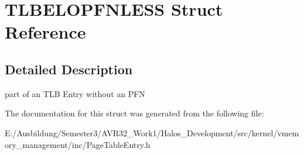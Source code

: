 \hypertarget{struct_t_l_b_e_l_o_p_f_n_l_e_s_s}{
\section{TLBELOPFNLESS Struct Reference}
\label{struct_t_l_b_e_l_o_p_f_n_l_e_s_s}
}


\subsection{Detailed Description}
part of an TLB Entry without an PFN 

The documentation for this struct was generated from the following file:\begin{CompactItemize}
\item 
E:/Ausbildung/Semester3/AVR32\_\-Work1/Halos\_\-Development/src/kernel/vmemory\_\-management/inc/PageTableEntry.h\end{CompactItemize}
